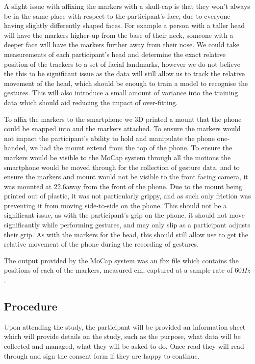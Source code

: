 A slight issue with affixing the markers with a skull-cap is that they won't always be in the same place with respect to the participant's face, due to everyone having slightly differently shaped faces. For example a person with a taller head will have the markers higher-up from the base of their neck, someone with a deeper face will have the markers further away from their nose.
We could take measurements of each participant's head and determine the exact relative position of the trackers to a set of facial landmarks, however we do not believe the this to be significant issue as the data will still allow us to track the relative movement of the head, which should be enough to train a model to recognise the gestures. This will also introduce a small amount of variance into the training data which should aid reducing the impact of over-fitting.

To affix the markers to the smartphone we 3D printed a mount that the phone could be snapped into and the markers attached.
To ensure the markers would not impact the participant's ability to hold and manipulate the phone one-handed, we had the mount extend from the top of the phone. To ensure the markers would be visible to the MoCap system through all the motions the smartphone would be moved through for the collection of gesture data, and to ensure the markers and mount would not be visible to the front facing camera, it was mounted at 22.6\textdegree away from the front of the phone.
Due to the mount being printed out of plastic, it was not particularly grippy, and as such only friction was preventing it from moving side-to-side on the phone. This should not be a significant issue, as with the participant's grip on the phone, it should not move significantly while performing gestures, and may only slip as a participant adjusts their grip. As with the markers for the head, this should still allow use to get the relative movement of the phone during the recording of gestures.
\nl{}

The output provided by the MoCap system was an fbx file which contains the positions of each of the markers, measured cm, captured at a sample rate of $60Hz$. 

\subsection{Procedure}
Upon attending the study, the participant will be provided an information sheet which will provide details on the study, such as the purpose, what data will be collected and managed, what they will be asked to do. Once read they will read through and sign the consent form if they are happy to continue.

